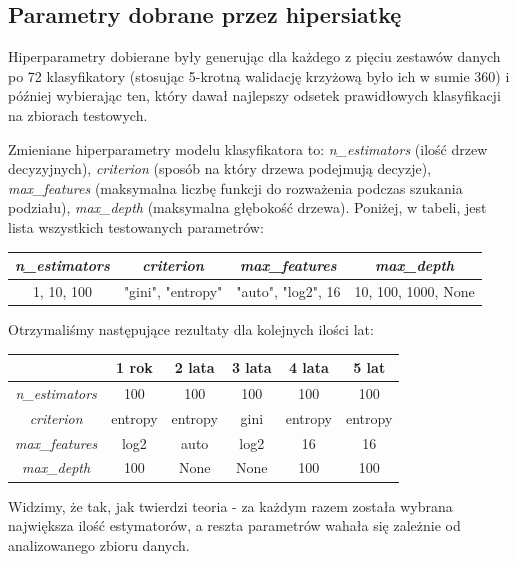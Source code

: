 \documentclass[11pt]{article}
\begin{document}
\subsection{Parametry dobrane przez hipersiatkę}
Hiperparametry dobierane były generując dla każdego z pięciu zestawów danych po 72 klasyfikatory (stosując 5-krotną walidację krzyżową było ich w sumie 360) i później wybierając ten, który dawał najlepszy odsetek prawidłowych klasyfikacji na zbiorach testowych.

Zmieniane hiperparametry modelu klasyfikatora to: \textsl{n\_estimators} (ilość drzew decyzyjnych), \textsl{criterion} (sposób na który drzewa podejmują decyzje), \textsl{max\_features} (maksymalna liczbę funkcji do rozważenia podczas szukania podziału), \textsl{max\_depth} (maksymalna głębokość drzewa). Poniżej, w tabeli, jest lista wszystkich testowanych parametrów:

\begin{center}
	\begin{tabular}{|c|c|c|c|}
		\hline
		\textit{n\_estimators}& \textit{criterion} & \textit{max\_features} & \textit{max\_depth}\\ \hline
		1, 10, 100 & "gini", "entropy" & "auto", "log2", 16 & 10, 100, 1000, None \\ \hline
	\end{tabular}
\end{center}

Otrzymaliśmy następujące rezultaty dla kolejnych ilości lat:

\begin{center}
	\begin{tabular}{|c|c|c|c|c|c|}
		\hline
		& \textbf{1 rok} & \textbf{2 lata} & \textbf{3 lata} & \textbf{4 lata} & \textbf{5 lat} \\ \hline
		\textit{n\_estimators} & 100 & 100 & 100 & 100 & 100 \\ \hline
		\textit{criterion} & entropy & entropy & gini & entropy & entropy \\ \hline
		\textit{max\_features} & log2 & auto & log2 & 16 & 16 \\ \hline
		\textit{max\_depth} & 100 & None & None & 100 & 100 \\ \hline
	\end{tabular}
\end{center}

Widzimy, że tak, jak twierdzi teoria - za każdym razem została wybrana największa ilość estymatorów, a reszta parametrów wahała się zależnie od analizowanego zbioru danych. 
\end{document}
